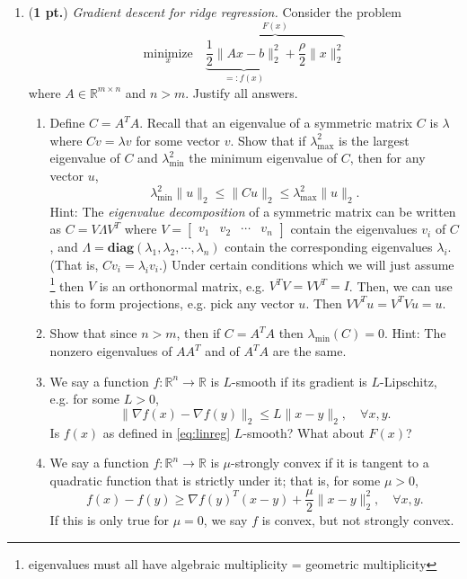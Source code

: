 \documentclass{article}
\newcommand{\R}{\mathbb R}
\newcommand{\bmat}{\left[\begin{matrix}}
\newcommand{\emat}{\end{matrix}\right]}
\newcommand{\minimize}[1]{\underset{#1}{\text{minimize}}}
\newcommand{\diag}{\mathbf{diag}}
\newcommand{\showpoints}[1]{(\textbf{#1})}
\begin{document}
\begin{enumerate}





\item \showpoints{1 pt.}  \emph{Gradient descent for ridge regression.} Consider the problem 
\begin{equation}
\minimize{x} \quad \overbrace{\underbrace{\frac{1}{2}\|Ax-b\|_2^2}_{=:f(x)} + \frac{\rho}{2}\|x\|_2^2}^{F(x)}
\label{eq:linreg}
\end{equation}
where $A\in \R^{m\times n}$ and $n > m$. Justify all answers.
\begin{enumerate}
\item Define $C=A^TA$. Recall that an eigenvalue of a symmetric matrix $C$ is $\lambda$ where $Cv = \lambda v$ for some vector $v$. Show that if $\lambda_{\max}^2$ is the largest eigenvalue of $C$ and $\lambda_{\min}^2$ the minimum eigenvalue of $C$, then for any vector $u$,
\[
\lambda_{\min}^2 \|u\|_2\leq \|Cu\|_2 \leq \lambda_{\max}^2 \|u\|_2.
\]
Hint: The \emph{eigenvalue decomposition} of a symmetric matrix can be written as $C = V\Lambda V^T$ where $V = \bmat v_1 & v_2 & \cdots & v_n\emat$ contain the eigenvalues $v_i$ of $C$, and $\Lambda = \diag(\lambda_1,\lambda_2,\cdots,\lambda_n)$ contain the corresponding eigenvalues $\lambda_i$. (That is, $Cv_i = \lambda_i v_i$.) Under certain conditions which we will just assume \footnote{eigenvalues must all have algebraic multiplicity = geometric multiplicity} then $V$ is an orthonormal matrix, e.g. $V^TV=VV^T = I$. Then, we can use this to form projections, e.g. pick any vector $u$. Then $VV^Tu = V^TVu = u$. 



\item Show that since $n > m$, then if $C = A^TA$ then $\lambda_{\min}(C) = 0$. Hint: The nonzero eigenvalues of $AA^T$ and of $A^TA$ are the same.


\item We say a function $f:\R^n\to\R$ is $L$-smooth if its gradient is $L$-Lipschitz, e.g. for some $L>0$,
\[
\|\nabla f(x) - \nabla f(y)\|_2 \leq L\|x-y\|_2,\quad \forall x,y.
\]
Is $f(x)$ as defined in \eqref{eq:linreg} $L$-smooth? What about  $F(x)$?




\item We say a function $f:\R^n\to\R$ is $\mu$-strongly convex if it is tangent to a quadratic function that is strictly under it; that is, for some $\mu > 0$, 
\[
f(x)-f(y) \geq \nabla f(y)^T(x-y)+\frac{\mu}{2}\|x-y\|_2^2,\quad \forall x,y.
\]
If this is only true for $\mu = 0$, we say $f$ is convex, but not strongly convex. 


\end{enumerate}
\end{enumerate}
\end{document}
